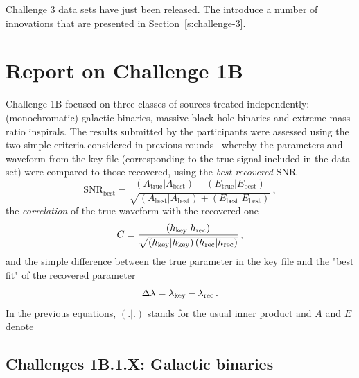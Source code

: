 \documentclass{iopart}
\begin{document}
Challenge 3 data sets have just been released. The introduce a number of innovations that are presented in Section~\ref{s:challenge-3}.


\section{Report on Challenge 1B}
\label{s:challenge-1b}

Challenge 1B focused on three classes of sources treated independently: (monochromatic) galactic binaries, massive black hole binaries and extreme mass ratio inspirals. The results submitted by the participants were assessed using the two simple criteria considered in previous rounds~\cite{mldcgwdaw1, mldcamaldi2} whereby the parameters and waveform from the key file (corresponding to the true signal included in the data set) were compared to those recovered, using the {\em best recovered} SNR
%
\begin{equation}
\mathrm{SNR}_\mathrm{best}  = \frac{(A_\mathrm{true}|A_\mathrm{best}) + (E_\mathrm{true}|E_\mathrm{best})}
{\sqrt{(A_\mathrm{best}|A_\mathrm{best}) + (E_\mathrm{best}|E_\mathrm{best})}}\,,
\label{e:SNR}
\end{equation}
%
the {\em correlation} of the true waveform with the recovered one
%
\begin{equation}
\label{cor}
C = \frac{\left(h_{\rm key}|h_{\rm rec}\right)}{\sqrt{\left(h_{\rm key}|h_{\rm key}\right)\left(h_{\rm rec}|h_{\rm rec}\right)}}\,,
\label{e:C}
\end{equation}
%
and the simple difference between the true parameter in the key file and the "best fit" of the recovered parameter
%
\begin{equation}
\Delta\lambda = \lambda_{\rm key} - \lambda_{\rm rec}\,.
\label{e:deltalambda}
\end{equation}
%
In the previous equations, $(.|.)$ stands for the usual inner product and $A$ and $E$ denote 

\subsection{Challenges 1B.1.X: Galactic binaries}
\end{document}
